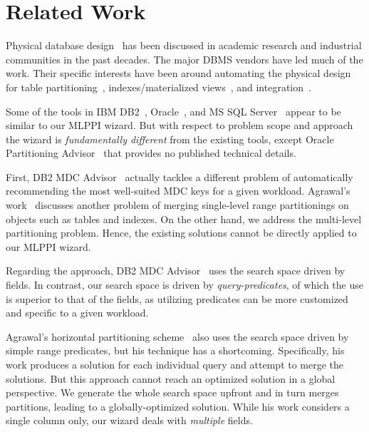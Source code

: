 \documentclass[runningheads]{comsis2}
\begin{document}
\section{Related Work}
\label{sec:related_work}

Physical database design~\cite{finkelstein1988physical,labio1997physical,rozen1991framework} 
has been discussed in \hbox{academic} research and industrial communities in the past decades.
The major DBMS vendors have led much of the work. 
Their specific interests have been around automating the physical design for table 
partitioning~\cite{agrawal04:integrating,Lightstone04:db2auto,nehme2011automated,sheet2009oracle,saa2007oracle,rao2002automating}, indexes/materialized views~\cite{Agrawal04:sqlserver,agrawal2000automated,dash2011cophy,Kimura11,itwsqlserver,valentin2000db2,zilio2004recommending}, and integration~\cite{Zilio04:db2design}.

Some of the tools in IBM DB2~\cite{Lightstone04:db2auto}, 
Oracle~\cite{sheet2009oracle}, and MS SQL Server~\cite{agrawal04:integrating} 
appear to be similar to our MLPPI wizard. 
But with respect to problem scope and approach the wizard 
is {\em fundamentally different} from the existing tools, 
except Oracle Partitioning \hbox{Advisor}~\cite{sheet2009oracle} that provides no published technical details. 

First, DB2 MDC Advisor~\cite{Lightstone04:db2auto} actually tackles 
a different problem of automatically recommending the most well-suited MDC 
keys for a given workload. 
Agrawal's work~\cite{agrawal04:integrating} 
discusses another problem of merging \hbox{single-level} range partitionings on objects such as tables and indexes. 
On the other hand, we address the multi-level \hbox{partitioning} problem. 
Hence, the existing solutions cannot be directly applied to our MLPPI wizard.   

Regarding the approach, DB2 MDC Advisor~\cite{Lightstone04:db2auto} uses 
the search space driven by fields. In contrast, our search 
space is driven by {\em query-predicates}, of which the use is superior to 
that of the fields, as utilizing predicates can be more customized and specific to a given workload. 

Agrawal's horizontal partitioning scheme~\cite{agrawal04:integrating} 
also uses the search space driven by simple range predicates, but 
his technique has a shortcoming. 
Specifically, his work produces a solution for each individual query and attempt 
to merge the solutions. But this approach cannot reach 
an optimized solution in a global perspective.
We generate the whole search space upfront and in turn merges partitions, 
leading to a \hbox{globally-optimized} solution. 
While his work considers a single column only, our wizard deals with {\em multiple} fields.
\end{document}
